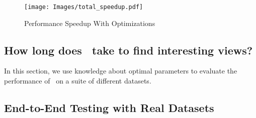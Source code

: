 \begin{figure}[h]
  \centering
    \texttt{[image: Images/total\_speedup.pdf]}
  \caption{Performance Speedup With Optimizations} 
  \label{fig:total_speed_up}
\end{figure}

\subsection{How long does \SeeDB\ take to find interesting views?}

In this section, we use knowledge about optimal parameters to evaluate the
performance of \SeeDB\ on a suite of different datasets.

\subsection{End-to-End Testing with Real Datasets}
